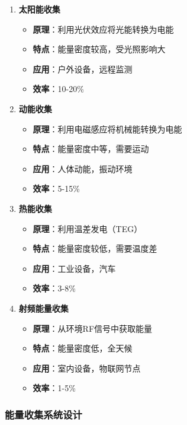 \documentclass[12pt,UTF8]{ctexbook}
\begin{document}
\begin{enumerate}
    \item \textbf{太阳能收集}
    \begin{itemize}
        \item \textbf{原理}：利用光伏效应将光能转换为电能
        \item \textbf{特点}：能量密度较高，受光照影响大
        \item \textbf{应用}：户外设备，远程监测
        \item \textbf{效率}：10-20\%
    \end{itemize}
    
    \item \textbf{动能收集}
    \begin{itemize}
        \item \textbf{原理}：利用电磁感应将机械能转换为电能
        \item \textbf{特点}：能量密度中等，需要运动
        \item \textbf{应用}：人体动能，振动环境
        \item \textbf{效率}：5-15\%
    \end{itemize}
    
    \item \textbf{热能收集}
    \begin{itemize}
        \item \textbf{原理}：利用温差发电（TEG）
        \item \textbf{特点}：能量密度较低，需要温度差
        \item \textbf{应用}：工业设备，汽车
        \item \textbf{效率}：3-8\%
    \end{itemize}
    
    \item \textbf{射频能量收集}
    \begin{itemize}
        \item \textbf{原理}：从环境RF信号中获取能量
        \item \textbf{特点}：能量密度低，全天候
        \item \textbf{应用}：室内设备，物联网节点
        \item \textbf{效率}：1-5\%
    \end{itemize}
\end{enumerate}

\subsubsection{能量收集系统设计}
\end{document}
